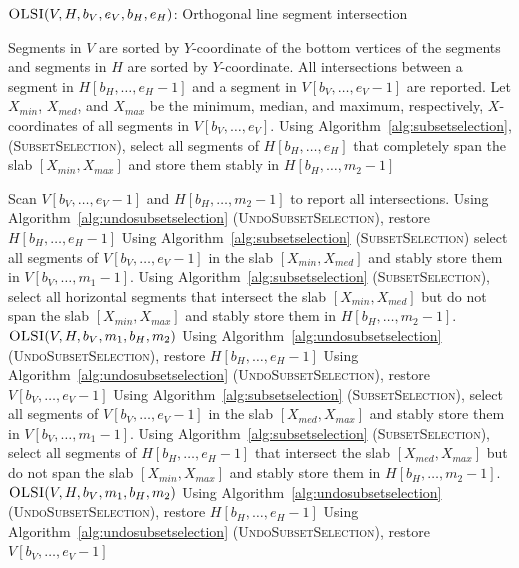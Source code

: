 \documentclass{elsart}
\begin{document}
\begin{algorithm}
  \caption{$\textsc{OLSI}(V,H,b_V,e_V,b_H,e_H)$:
    Orthogonal line segment intersection}
\label{alg:orth}\label{alg:olsi}
  \begin{algorithmic}[1]
    \REQUIRE Segments in $V$ are sorted by $Y$-coordinate of the
    bottom vertices of the segments and segments in $H$ are sorted by $Y$-coordinate.
    \ENSURE All intersections between a segment in $H[b_H,\ldots,e_H-1]$
    and a segment in $V[b_V,\ldots,e_V-1]$ are reported.
    \ELSE
       \STATE Let $X_{min}$, $X_{med}$, and $X_{max}$ be the minimum, median, and maximum,
       respectively,
       $X$-coordinates of all
segments in $V[b_V,\ldots,e_V]$.
       \STATE Using Algorithm~\ref{alg:subsetselection},
       (\textsc{SubsetSelection}), select all segments of
       $H[b_H,\ldots,e_H]$ that completely span the slab $[X_{min},X_{max}]$
       and store them stably in $H[b_H,\ldots,m_2-1]$
              
       \STATE Scan $V[b_V,\ldots,e_V-1]$ and $H[b_H,\ldots,m_2-1]$ to report all intersections.
       \STATE Using Algorithm~\ref{alg:undosubsetselection}
       (\textsc{UndoSubsetSelection}), 
    restore $H[b_H,\ldots,e_H-1]$
       \STATE Using Algorithm~\ref{alg:subsetselection}
       (\textsc{SubsetSelection}) select all segments of
       $V[b_V,\ldots,e_V-1]$ in the slab $[X_{min},X_{med}]$ and stably
       store them in $V[b_V,\ldots,m_1-1]$.
       \STATE Using Algorithm~\ref{alg:subsetselection}
       (\textsc{SubsetSelection}), select all horizontal segments that
       intersect the slab $[X_{min},X_{med}]$ but
              do not span the slab $[X_{min},X_{max}]$ and stably
          store them
              in $H[b_H,\ldots,m_2-1]$.
       \STATE $\textsc{OLSI}(V, H, b_V,m_1,b_H,m_2)$
       \STATE Using Algorithm~\ref{alg:undosubsetselection}
       (\textsc{UndoSubsetSelection}), restore $H[b_H,\ldots,e_H-1]$ 
       \STATE Using Algorithm~\ref{alg:undosubsetselection}
    (\textsc{UndoSubsetSelection}), restore $V[b_V,\ldots,e_V-1]$
       \STATE Using Algorithm~\ref{alg:subsetselection} 
       (\textsc{SubsetSelection}), select all 
       segments of $V[b_V,\ldots,e_V-1]$ in the slab $[X_{med},X_{max}]$ and stably store them
              in $V[b_V,\ldots,m_1-1]$.
       \STATE Using Algorithm~\ref{alg:subsetselection} 
        (\textsc{SubsetSelection}), select all segments of
       $H[b_H,\ldots,e_H-1]$ that intersect the slab
       $[X_{med},X_{max}]$ but
              do not span the slab $[X_{min},X_{max}]$ and stably store
          them in $H[b_H,\ldots,m_2-1]$.
       \STATE $\textsc{OLSI}(V, H, b_V,m_1,b_H,m_2)$
       \STATE Using Algorithm~\ref{alg:undosubsetselection}
       (\textsc{UndoSubsetSelection}), restore $H[b_H,\ldots,e_H-1]$ 
       \STATE Using Algorithm~\ref{alg:undosubsetselection}
    (\textsc{UndoSubsetSelection}), restore $V[b_V,\ldots,e_V-1]$
   \ENDIF
  \end{algorithmic}
\end{algorithm}
\end{document}
